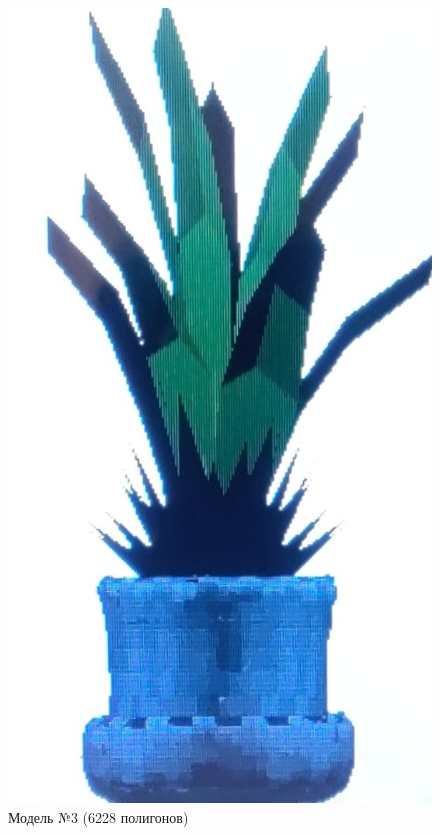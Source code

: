 \begin{figure}[h]
	\centering
	\vspace*{-9.5cm}\includegraphics[scale=0.2 ]{img/models/plant.jpg}
	\caption{Модель №3 (6228 полигонов)}
	\label{fig:plant_img}
\end{figure}
